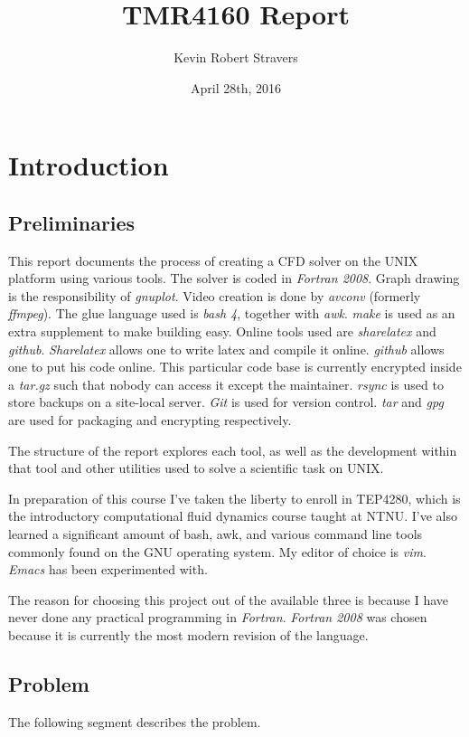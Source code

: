 \documentclass[listof=totoc]{report}
\title{TMR4160 Report}
\author{Kevin Robert Stravers}
\date{April 28th, 2016}
\begin{document}
\maketitle

\tableofcontents
\lstlistoflistings

\chapter{Introduction}
\section{Preliminaries}
This report documents the process of creating a CFD solver on the UNIX platform using various tools. The solver is coded in \emph{Fortran 2008}. Graph drawing is the responsibility of \emph{gnuplot}. Video creation is done by \emph{avconv} (formerly \emph{ffmpeg}). The glue language used is \emph{bash 4}, together with \emph{awk}. \emph{make} is used as an extra supplement to make building easy. Online tools used are \emph{sharelatex} and \emph{github}. \emph{Sharelatex} allows one to write latex and compile it online. \emph{github} allows one to put his code online. This particular code base is currently encrypted inside a \emph{tar.gz} such that nobody can access it except the maintainer. \emph{rsync} is used to store backups on a site-local server. \emph{Git} is used for version control. \emph{tar} and \emph{gpg} are used for packaging and encrypting respectively.

The structure of the report explores each tool, as well as the development within that tool and other utilities used to solve a scientific task on UNIX.

In preparation of this course I've taken the liberty to enroll in TEP4280, which is the introductory computational fluid dynamics course taught at NTNU. I've also learned a significant amount of bash, awk, and various command line tools commonly found on the GNU operating system. My editor of choice is \emph{vim}. \emph{Emacs} has been experimented with.

The reason for choosing this project out of the available three is because I have never done any practical programming in \emph{Fortran}. \emph{Fortran 2008} was chosen because it is currently the most modern revision of the language.

\section{Problem}
The following segment describes the problem.
\end{document}
